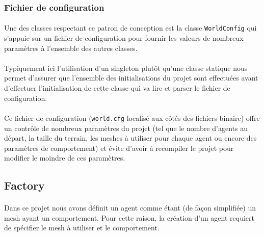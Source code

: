 \subsubsection{Fichier de configuration}

\paragraph{}
Une des classes respectant ce patron de conception est la classe
\verb!WorldConfig! qui s'appuie sur un fichier de configuration pour fournir
les valeurs de nombreux paramètres à l'ensemble des autres classes.

\paragraph{}
Typiquement ici l'utilisation d'un singleton plutôt qu'une classe statique
nous permet d'assurer que l'ensemble des initialisations du projet sont
effectuées avant d'effectuer l'initialisation de cette classe qui va lire et
parser le fichier de configuration.

\paragraph{}
Ce fichier de configuration (\verb!world.cfg! localisé aux côtés des fichiers
binaire) offre un contrôle de nombreux paramètres du projet (tel que le nombre
d'agents au départ, la taille du terrain, les meshes à utiliser pour chaque
agent ou encore des paramètres de comportement) et évite d'avoir à recompiler
le projet pour modifier le moindre de ces paramètres.


\subsection{Factory}
\paragraph{}
Dans ce projet nous avons définit un agent comme étant (de façon simplifiée)
un mesh ayant un comportement. Pour cette raison, la création d'un agent
requiert de spécifier le mesh à utiliser et le comportement.

